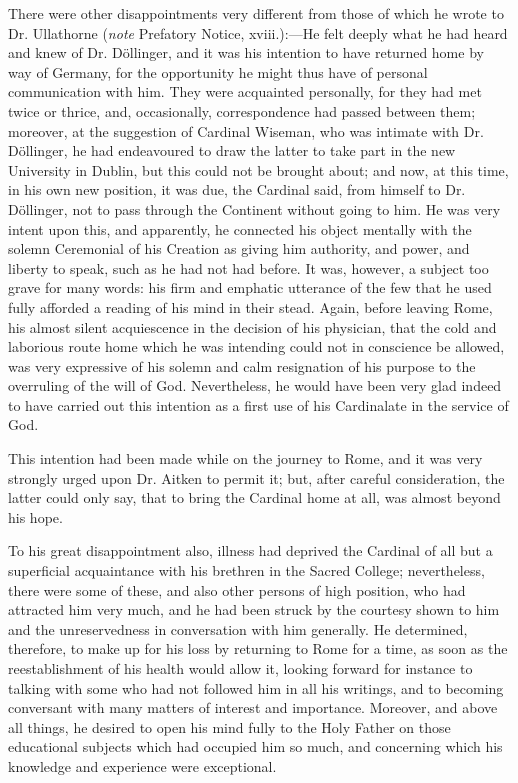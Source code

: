 There were other disappointments very different from those of which
he wrote to Dr. Ullathorne (\emph{note} Prefatory Notice, xviii.):—He
felt deeply what he had heard and knew of Dr. Döllinger, and it was
his intention to have returned home by way of Germany, for the
opportunity he might thus have of personal communication with him.
They were acquainted personally, for they had met twice or thrice,
and, occasionally, correspondence had passed between them; moreover,
at the suggestion of Cardinal Wiseman, who was intimate with Dr.
Döllinger, he had endeavoured to draw the latter to take part in the
new University in Dublin, but this could not be brought about; and
now, at this time, in his own new position, it was due, the Cardinal
said, from himself to Dr. Döllinger, not to pass through the
Continent without going to him. He was very intent upon this, and apparently, he connected his object mentally with the solemn
Ceremonial of his Creation as giving him authority, and power, and
liberty to speak, such as he had not had before. It was, however, a
subject too grave for many words: his firm and emphatic utterance of
the few that he used fully afforded a reading of his mind in their
stead. Again, before leaving Rome, his almost silent acquiescence in
the decision of his physician, that the cold and laborious route home
which he was intending could not in conscience be allowed, was very
expressive of his solemn and calm resignation of his purpose to the
overruling of the will of God. Nevertheless, he would have been very
glad indeed to have carried out this intention as a first use of his
Cardinalate in the service of God.

This intention had been made while on the journey to Rome, and it
was very strongly urged upon Dr. Aitken to permit it; but, after
careful consideration, the latter could only say, that to bring the
Cardinal home at all, was almost beyond his hope.

To his great disappointment also, illness had deprived the Cardinal
of all but a superficial acquaintance with his brethren in the Sacred
College; nevertheless, there were some of these, and also other
persons of high position, who had attracted him very much, and he had
been struck by the courtesy shown to him and the unreservedness
in conversation with him generally. He determined, therefore, to make
up for his loss by returning to Rome for a time, as soon as the
reestablishment of his health would allow it, looking forward for
instance to talking with some who had not followed him in all his
writings, and to becoming conversant with many matters of interest and
importance. Moreover, and above all things, he desired to open his
mind fully to the Holy Father on those educational subjects which had
occupied him so much, and concerning which his knowledge and
experience were exceptional.

